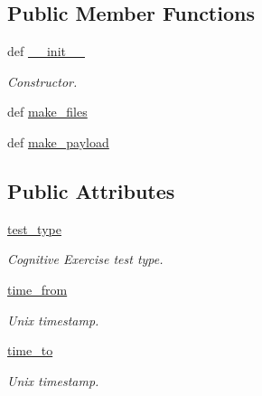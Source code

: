 \subsection*{Public Member Functions}
\begin{DoxyCompactItemize}
\item 
def \hyperlink{classRappCloud_1_1CloudMsgs_1_1CognitiveGetHistory_1_1CognitiveGetHistory_1_1Request_a84dc9ca39155e00e71558a1170831f11}{\-\_\-\-\_\-init\-\_\-\-\_\-}
\begin{DoxyCompactList}\small\item\em Constructor. \end{DoxyCompactList}\item 
def \hyperlink{classRappCloud_1_1CloudMsgs_1_1CognitiveGetHistory_1_1CognitiveGetHistory_1_1Request_a93ab7a8667a375fb8c4270aa41b40aff}{make\-\_\-files}
\item 
def \hyperlink{classRappCloud_1_1CloudMsgs_1_1CognitiveGetHistory_1_1CognitiveGetHistory_1_1Request_a043a34957f4de1d5c5f99187bddf923e}{make\-\_\-payload}
\end{DoxyCompactItemize}
\subsection*{Public Attributes}
\begin{DoxyCompactItemize}
\item 
\hyperlink{classRappCloud_1_1CloudMsgs_1_1CognitiveGetHistory_1_1CognitiveGetHistory_1_1Request_aa76b643781c5055acb1825220b2a4650}{test\-\_\-type}
\begin{DoxyCompactList}\small\item\em Cognitive Exercise test type. \end{DoxyCompactList}\item 
\hyperlink{classRappCloud_1_1CloudMsgs_1_1CognitiveGetHistory_1_1CognitiveGetHistory_1_1Request_a896a59c9fdfce2c674dbe2803db0ffca}{time\-\_\-from}
\begin{DoxyCompactList}\small\item\em Unix timestamp. \end{DoxyCompactList}\item 
\hyperlink{classRappCloud_1_1CloudMsgs_1_1CognitiveGetHistory_1_1CognitiveGetHistory_1_1Request_a48bfcc4c912e739f24781fa20bd0664c}{time\-\_\-to}
\begin{DoxyCompactList}\small\item\em Unix timestamp. \end{DoxyCompactList}\end{DoxyCompactItemize}


